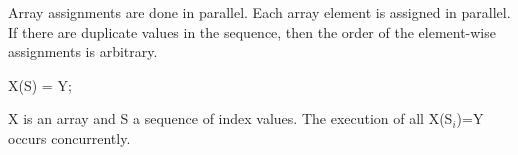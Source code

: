 Array assignments are done in parallel. Each array element is assigned
in parallel. If there are duplicate values in the sequence, then the
order of the element-wise assignments is arbitrary.

\begin{example}
\begin{chapel}
X(S) = Y;
\end{chapel}
X is an array and S a sequence of index values. The execution of all X(S$_i$)=Y
occurs concurrently.
\end{example}


